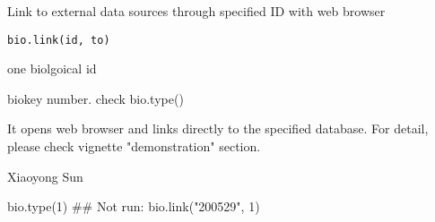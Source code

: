 \begin{Description}\relax
Link to external data sources through specified ID with web browser
\end{Description}
\begin{Usage}
\begin{verbatim}
bio.link(id, to)
\end{verbatim}
\end{Usage}
\begin{Arguments}
\begin{ldescription}
\item[\code{id}] one biolgoical id 
\item[\code{to}] biokey number. check bio.type()
\end{ldescription}
\end{Arguments}
\begin{Details}\relax
It opens web browser and links directly to the specified database. For detail, please check vignette "demonstration" section.
\end{Details}
\begin{Author}\relax
Xiaoyong Sun
\end{Author}
\begin{Examples}
\begin{ExampleCode}
bio.type(1)
## Not run: bio.link("200529", 1)
\end{ExampleCode}
\end{Examples}

